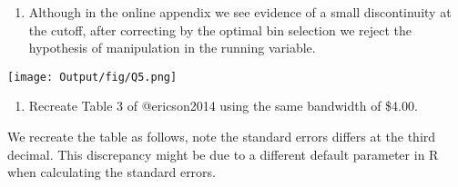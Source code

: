 \documentclass[
  12pt,
]{article}
\providecommand{\tightlist}{%
  \setlength{\itemsep}{0pt}\setlength{\parskip}{0pt}}
\begin{document}
\begin{enumerate}
\def\labelenumi{\arabic{enumi}.}
\setcounter{enumi}{4}
\tightlist
\item
  Although in the online appendix we see evidence of a small
  discontinuity at the cutoff, after correcting by the optimal bin
  selection we reject the hypothesis of manipulation in the running
  variable.
\end{enumerate}

\texttt{[image: Output/fig/Q5.png]} 

\newpage

\begin{enumerate}
\def\labelenumi{\arabic{enumi}.}
\setcounter{enumi}{5}
\tightlist
\item
  Recreate Table 3 of @ericson2014 using the same bandwidth of
  \$4.00.\newline
\end{enumerate}

We recreate the table as follows, note the standard errors differs at
the third decimal. This discrepancy might be due to a different default
parameter in R when calculating the standard errors.
\end{document}
